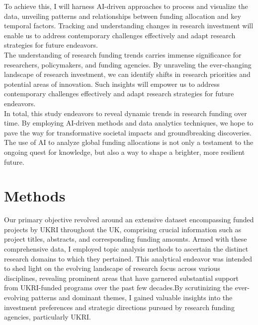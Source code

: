 \documentclass[12pt,twoside]{report}
\begin{document}
To achieve this, I will harness AI-driven approaches to process and visualize the data, unveiling patterns and relationships between funding allocation and key temporal factors. Tracking and understanding changes in research investment will enable us to address contemporary challenges effectively and adapt research strategies for future endeavors.\\

The understanding of research funding trends carries immense significance for researchers, policymakers, and funding agencies. By unraveling the ever-changing landscape of research investment, we can identify shifts in research priorities and potential areas of innovation. Such insights will empower us to address contemporary challenges effectively and adapt research strategies for future endeavors.\\

In total, this study endeavors to reveal dynamic trends in research funding over time. By employing AI-driven methods and data analytics techniques, we hope to pave the way for transformative societal impacts and groundbreaking discoveries. The use of AI to analyze global funding allocations is not only a testament to the ongoing quest for knowledge, but also a way to shape a brighter, more resilient future.\\






\chapter{Methods}
Our primary objective revolved around an extensive dataset encompassing funded projects by UKRI throughout the UK, comprising crucial information such as project titles, abstracts, and corresponding funding amounts. Armed with these comprehensive data, I employed topic analysis methods to ascertain the distinct research domains to which they pertained. This analytical endeavor was intended to shed light on the evolving landscape of research focus across various disciplines, revealing prominent areas that have garnered substantial support from UKRI-funded programs over the past few decades.By scrutinizing the ever-evolving patterns and dominant themes, I gained valuable insights into the investment preferences and strategic directions pursued by research funding agencies, particularly UKRI. \\
\end{document}
